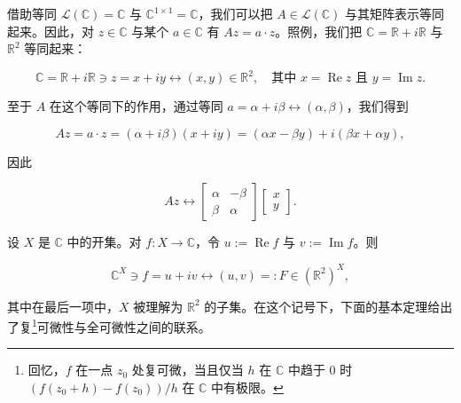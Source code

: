借助等同 $ \mathcal{L}(\mathbb{C}) = \mathbb{C} $ 与 $ \mathbb{C}^{1 \times 1} = \mathbb{C} $，我们可以把 $ A \in \mathcal{L}(\mathbb{C}) $ 与其矩阵表示等同起来。因此，对 $ z \in \mathbb{C} $ 与某个 $ a \in \mathbb{C} $ 有 $ Az = a \cdot z $。照例，我们把 $ \mathbb{C} = \mathbb{R} + i\mathbb{R} $ 与 $ \mathbb{R}^2 $ 等同起来：

\[
\mathbb{C} = \mathbb{R} + i\mathbb{R} \ni z = x + iy \leftrightarrow (x,y) \in \mathbb{R}^2 , \quad \text{其中 } x = \operatorname{Re} z \text{ 且 } y = \operatorname{Im} z .
\]

至于 $ A $ 在这个等同下的作用，通过等同 $ a = \alpha + i\beta \leftrightarrow (\alpha, \beta) $，我们得到

\[
Az = a \cdot z = (\alpha + i\beta)(x + iy) = (\alpha x - \beta y) + i(\beta x + \alpha y) ,
\]

因此

\begin{equation}
Az \leftrightarrow \begin{bmatrix} \alpha & -\beta \\ \beta & \alpha \end{bmatrix} \begin{bmatrix} x \\ y \end{bmatrix} .\tag{2.7}
\end{equation}

设 $ X $ 是 $ \mathbb{C} $ 中的开集。对 $ f : X \to \mathbb{C} $，令 $ u := \operatorname{Re} f $ 与 $ v := \operatorname{Im} f $。则

\[
\mathbb{C}^X \ni f = u + iv \leftrightarrow (u,v) =: F \in (\mathbb{R}^2)^X ,
\]

其中在最后一项中，$ X $ 被理解为 $ \mathbb{R}^2 $ 的子集。在这个记号下，下面的基本定理给出了复\footnote{回忆，$ f $ 在一点 $ z_0 $ 处复可微，当且仅当 $ h $ 在 $ \mathbb{C} $ 中趋于 $ 0 $ 时 $ (f(z_0 + h) - f(z_0))/h $ 在 $ \mathbb{C} $ 中有极限。}可微性与全可微性之间的联系。

